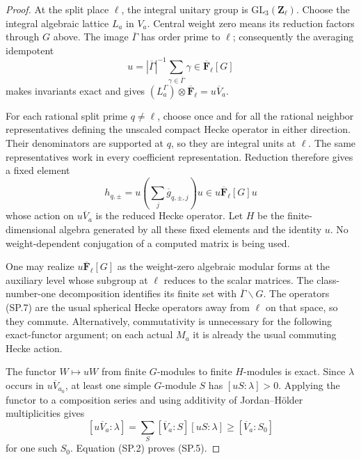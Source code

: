\begin{proof}
At the split place $\ell$, the integral unitary group is
$\mathrm{GL}_3(\mathbf Z_\ell)$. Choose the integral
algebraic lattice $L_a$ in $V_a$. Central weight zero
means its reduction factors through $G$ above. The image
$\overline\Gamma$ has order prime to $\ell$; consequently
the averaging idempotent
\[
       u=|\overline\Gamma|^{-1}
                      \sum_{\gamma\in\overline\Gamma}\gamma
                   \in\overline{\mathbf F}_\ell[G]
                                                               \tag{SP.6}
\]
makes invariants exact and gives
$(L_a^\Gamma)\otimes\overline{\mathbf F}_\ell=u\overline V_a$.

For each rational split prime $q\ne\ell$, choose once and
for all the rational neighbor representatives defining
the unscaled compact Hecke operator in either direction.
Their denominators are supported at $q$, so they are
integral units at $\ell$. The same representatives work
in every coefficient representation. Reduction therefore
gives a fixed element
\[
                h_{q,\pm}=u\left(\sum_j\overline g_{q,\pm,j}\right)u
                          \in u\overline{\mathbf F}_\ell[G]u
                                                               \tag{SP.7}
\]
whose action on $u\overline V_a$ is the reduced Hecke
operator. Let $H$ be the finite-dimensional algebra
generated by all these fixed elements and the identity
$u$. No weight-dependent conjugation of a computed matrix
is being used.

One may realize $u\overline{\mathbf F}_\ell[G]$ as the
weight-zero algebraic modular forms at the auxiliary level
whose subgroup at $\ell$ reduces to the scalar matrices.
The class-number-one decomposition identifies its finite
set with $\overline\Gamma\backslash G$. The operators
(SP.7) are the usual spherical Hecke operators away from
$\ell$ on that space, so they commute. Alternatively,
commutativity is unnecessary for the following exact-functor
argument; on each actual $M_a$ it is already the usual
commuting Hecke action.

The functor $W\mapsto uW$ from finite $G$-modules to
finite $H$-modules is exact. Since $\lambda$ occurs in
$u\overline V_{a_0}$, at least one simple $G$-module $S$
has $[uS:\lambda]>0$. Applying the functor to a composition
series and using additivity of Jordan--H\"older multiplicities
gives
\[
 [u\overline V_a:\lambda]
       =\sum_S[\overline V_a:S][uS:\lambda]
       \geq[\overline V_a:S_0]
                                                               \tag{SP.8}
\]
for one such $S_0$. Equation (SP.2) proves (SP.5).
\end{proof}

